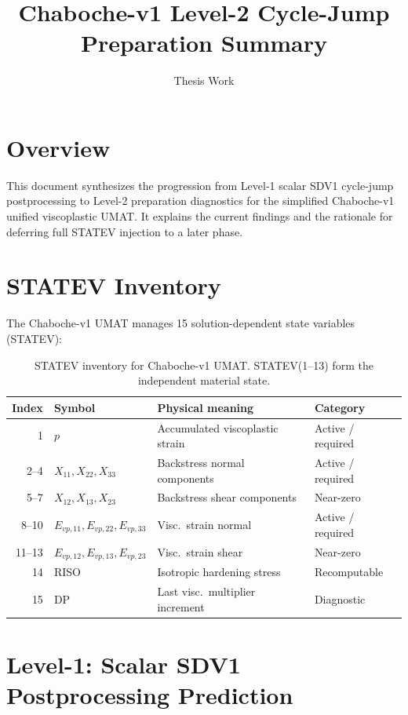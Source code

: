 \documentclass[11pt]{article}
\title{Chaboche-v1 Level-2 Cycle-Jump Preparation Summary}
\author{Thesis Work}
\date{}
\begin{document}
\maketitle

\section{Overview}

This document synthesizes the progression from Level-1 scalar SDV1 cycle-jump postprocessing to Level-2 preparation diagnostics for the simplified Chaboche-v1 unified viscoplastic UMAT. It explains the current findings and the rationale for deferring full STATEV injection to a later phase.

\section{STATEV Inventory}

The Chaboche-v1 UMAT manages 15 solution-dependent state variables (STATEV):

\begin{table}[ht]
\centering
\small
\begin{tabular}{r|l|l|l}
\toprule
\textbf{Index} & \textbf{Symbol} & \textbf{Physical meaning} & \textbf{Category} \\
\midrule
1  & $p$ & Accumulated viscoplastic strain & Active / required \\
2--4 & $X_{11}, X_{22}, X_{33}$ & Backstress normal components & Active / required \\
5--7 & $X_{12}, X_{13}, X_{23}$ & Backstress shear components & Near-zero \\
8--10 & $E_{vp,11}, E_{vp,22}, E_{vp,33}$ & Visc.~strain normal & Active / required \\
11--13 & $E_{vp,12}, E_{vp,13}, E_{vp,23}$ & Visc.~strain shear & Near-zero \\
14 & RISO & Isotropic hardening stress & Recomputable \\
15 & DP & Last visc.~multiplier increment & Diagnostic \\
\bottomrule
\end{tabular}
\caption{STATEV inventory for Chaboche-v1 UMAT. STATEV(1--13) form the independent material state.}
\end{table}

\section{Level-1: Scalar SDV1 Postprocessing Prediction}
\end{document}

